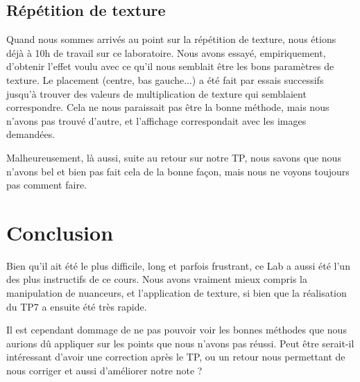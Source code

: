 \documentclass[10pt,a4paper]{article}
\begin{document}
\subsection{Répétition de texture}

Quand nous sommes arrivés au point sur la répétition de texture, nous étions déjà à 10h de travail sur ce laboratoire. Nous avons essayé, empiriquement, d'obtenir l'effet voulu avec ce qu'il nous semblait être les bons paramètres de texture. Le placement (centre, bas gauche...) a été fait par essais successifs jusqu'à trouver des valeurs de multiplication de texture qui semblaient correspondre. Cela ne nous paraissait pas être la bonne méthode, mais nous n'avons pas trouvé d'autre, et l'affichage correspondait avec les images demandées.

Malheureusement, là aussi, suite au retour sur notre TP, nous savons que nous n'avons bel et bien pas fait cela de la bonne façon, mais nous ne voyons toujours pas comment faire.

\section{Conclusion}

Bien qu'il ait été le plus difficile, long et parfois frustrant, ce Lab a aussi été l'un des plus instructifs de ce cours. Nous avons vraiment mieux compris la manipulation de nuanceurs, et l'application de texture, si bien que la réalisation du TP7 a ensuite été très rapide.

Il est cependant dommage de ne pas pouvoir voir les bonnes méthodes que nous aurions dû appliquer sur les points que nous n'avons pas réussi. Peut être serait-il intéressant d'avoir une correction après le TP, ou un retour nous permettant de nous corriger et aussi d'améliorer notre note ?
\end{document}
